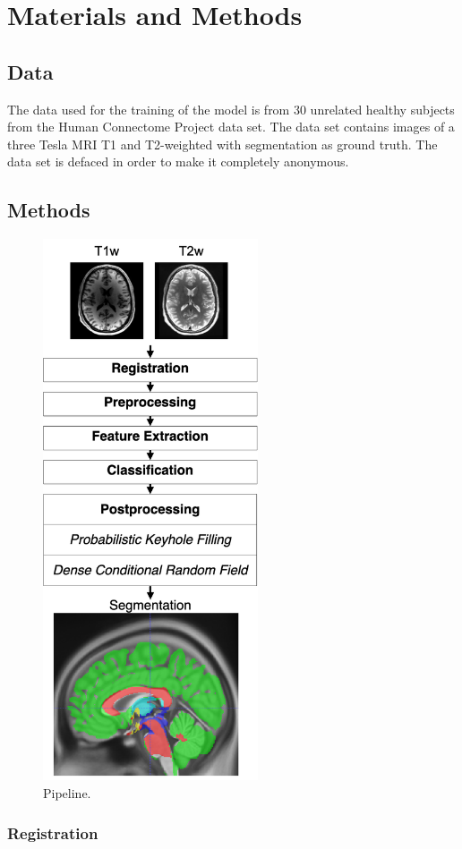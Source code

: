 \documentclass[journal]{IEEEtran}
\begin{document}
\section{Materials and Methods}
\subsection{Data}
The data used for the training of the model is from 30 unrelated healthy subjects from the Human Connectome Project data set. The data set contains images of a three Tesla MRI T1 and T2-weighted with segmentation as ground truth. The data set is defaced in order to make it  completely anonymous.
\subsection{Methods}
\begin{figure}[hb]
\centering
\includegraphics[width=2.5in]{img/pipeline}
\caption{Pipeline.}
\label{fig_pipeline}
\end{figure}


\subsubsection{Registration}
\end{document}
